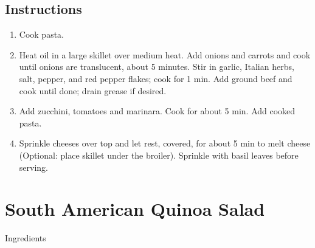 \documentclass[letterpaper,10pt,english]{sphinxmanual}
\begin{document}
\section{Instructions}
\label{\detokenize{Skillet_Las:instructions}}\begin{enumerate}
\item {} 
Cook pasta.

\item {} 
Heat oil in a large skillet over medium heat. Add onions and carrots and cook until onions are translucent, about 5 minutes. Stir in garlic, Italian herbs, salt, pepper, and red pepper flakes; cook for 1 min. Add ground beef and cook until done; drain grease if desired.

\item {} 
Add zucchini, tomatoes and marinara. Cook for about 5 min. Add cooked pasta.

\item {} 
Sprinkle cheeses over top and let rest, covered, for about 5 min to melt cheese (Optional: place skillet under the broiler). Sprinkle with basil leaves before serving.

\end{enumerate}


\chapter{South American Quinoa Salad}
\label{\detokenize{SA_Quinoa_Salad:south-american-quinoa-salad}}\label{\detokenize{SA_Quinoa_Salad::doc}}
Ingredients

%
\begin{sphinxVerbatim}[commandchars=\\\{\}]
  

     

    

   

   

  

    

    

    

   

    
\end{sphinxVerbatim}
\end{document}
